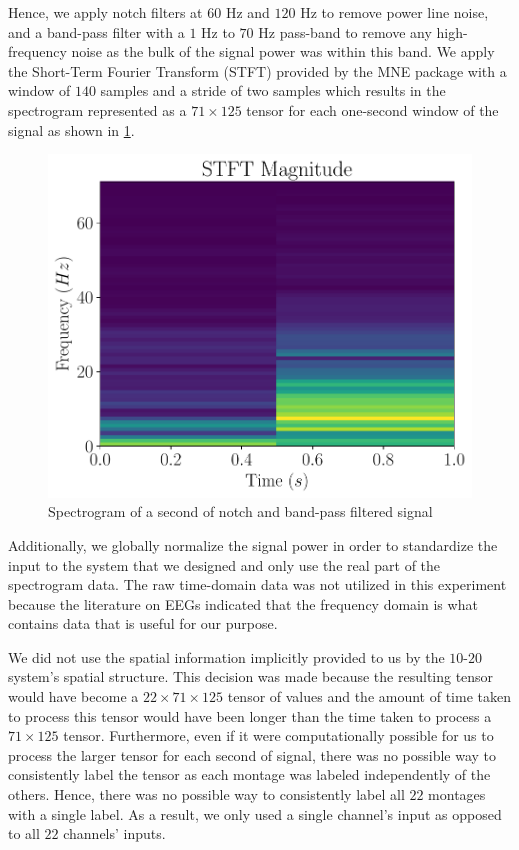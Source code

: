 Hence, we apply notch filters at $60$ Hz and $120$ Hz to remove power line noise, and a band-pass filter with a $1$ Hz to $70$ Hz pass-band to remove any high-frequency noise as the bulk of the signal power was within this band. We apply the Short-Term Fourier Transform (STFT) provided by the MNE package with a window of $140$ samples and a stride of two samples which results in the spectrogram represented as a $71 \times 125$ tensor for each one-second window of the signal as shown in \cref{fig:stft}. 

\begin{figure}[!ht]
	\centering
	\includegraphics[width=0.65\linewidth]{pictures/plot21.pdf}
	\caption[Example of Spectrogram]{Spectrogram of a second of notch and band-pass filtered signal}\label{fig:stft}  
\end{figure}

Additionally, we globally normalize the signal power in order to standardize the input to the system that we designed and only use the real part of the spectrogram data. The raw time-domain data was not utilized in this experiment because the literature \cite{eegs_info, eeg_info2, mayo_eegs} on EEGs indicated that the frequency domain is what contains data that is useful for our purpose.

We did not use the spatial information implicitly provided to us by the $10$-$20$ system's spatial structure. This decision was made because the resulting tensor would have become a $22 \times 71 \times 125$ tensor of values and the amount of time taken to process this tensor would have been longer than the time taken to process a $71 \times 125$ tensor. Furthermore, even if it were computationally possible for us to process the larger tensor for each second of signal, there was no possible way to consistently label the tensor as each montage was labeled independently of the others. Hence, there was no possible way to consistently label all $22$ montages with a single label. As a result, we only used a single channel's input as opposed to all $22$ channels' inputs. 

